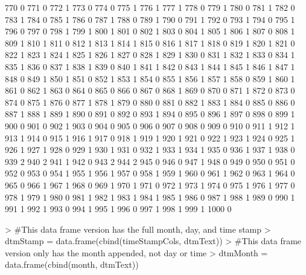 \documentclass[compress,8pt]{beamer}
\begin{document}
\begin{frame}
\begin{Schunk}
  770     0
  771     0
  772     1
  773     0
  774     0
  775     1
  776     1
  777     1
  778     0
  779     1
  780     0
  781     1
  782     0
  783     1
  784     0
  785     1
  786     0
  787     1
  788     0
  789     1
  790     0
  791     1
  792     0
  793     1
  794     0
  795     1
  796     0
  797     0
  798     1
  799     1
  800     1
  801     0
  802     1
  803     0
  804     1
  805     1
  806     1
  807     0
  808     1
  809     1
  810     1
  811     0
  812     1
  813     1
  814     1
  815     0
  816     1
  817     1
  818     0
  819     1
  820     1
  821     0
  822     1
  823     1
  824     1
  825     1
  826     1
  827     0
  828     1
  829     1
  830     0
  831     1
  832     1
  833     0
  834     1
  835     1
  836     0
  837     1
  838     1
  839     0
  840     1
  841     1
  842     0
  843     1
  844     1
  845     1
  846     1
  847     1
  848     0
  849     1
  850     1
  851     0
  852     1
  853     1
  854     0
  855     1
  856     1
  857     1
  858     0
  859     1
  860     1
  861     0
  862     1
  863     0
  864     0
  865     0
  866     0
  867     0
  868     1
  869     0
  870     0
  871     1
  872     0
  873     0
  874     0
  875     1
  876     0
  877     1
  878     1
  879     0
  880     0
  881     0
  882     1
  883     1
  884     0
  885     0
  886     0
  887     1
  888     1
  889     1
  890     0
  891     0
  892     0
  893     1
  894     0
  895     0
  896     1
  897     0
  898     0
  899     1
  900     0
  901     0
  902     1
  903     0
  904     0
  905     0
  906     0
  907     0
  908     0
  909     0
  910     0
  911     1
  912     1
  913     1
  914     0
  915     1
  916     1
  917     0
  918     1
  919     1
  920     1
  921     0
  922     1
  923     1
  924     0
  925     1
  926     1
  927     1
  928     0
  929     1
  930     1
  931     0
  932     1
  933     1
  934     1
  935     0
  936     1
  937     1
  938     0
  939     2
  940     2
  941     1
  942     0
  943     2
  944     2
  945     0
  946     0
  947     1
  948     0
  949     0
  950     0
  951     0
  952     0
  953     0
  954     1
  955     1
  956     1
  957     0
  958     1
  959     1
  960     0
  961     1
  962     0
  963     1
  964     0
  965     0
  966     1
  967     1
  968     0
  969     1
  970     1
  971     0
  972     1
  973     1
  974     0
  975     1
  976     1
  977     0
  978     1
  979     1
  980     0
  981     1
  982     1
  983     1
  984     1
  985     1
  986     0
  987     1
  988     1
  989     0
  990     1
  991     1
  992     1
  993     0
  994     1
  995     1
  996     0
  997     1
  998     1
  999     1
  1000    0\begin{Sinput}
> #This data frame version has the full month, day, and time stamp 
> dtmStamp = data.frame(cbind(timeStampCols, dtmText))
> #This data frame version only has the month appended, not day or time
> dtmMonth = data.frame(cbind(month, dtmText))
\end{Sinput}
\end{Schunk}
\end{frame}
\end{document}
